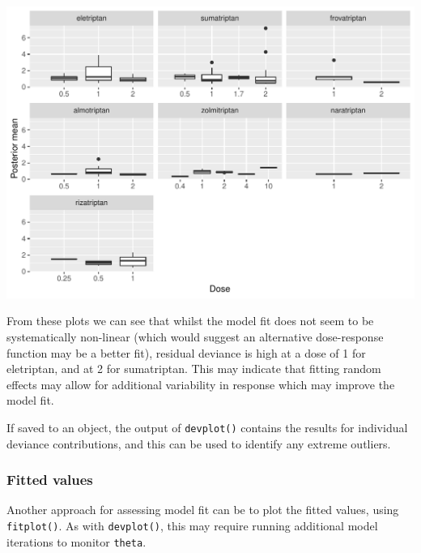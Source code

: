 \documentclass[]{article}
\newenvironment{Shaded}{\begin{snugshade}}{\end{snugshade}}
\newcommand{\CommentTok}[1]{\textcolor[rgb]{0.56,0.35,0.01}{\textit{#1}}}
\newcommand{\KeywordTok}[1]{\textcolor[rgb]{0.13,0.29,0.53}{\textbf{#1}}}
\newcommand{\NormalTok}[1]{#1}
\begin{document}
\includegraphics{mbnmadose_files/figure-latex/unnamed-chunk-34-1.pdf}

From these plots we can see that whilst the model fit does not seem to
be systematically non-linear (which would suggest an alternative
dose-response function may be a better fit), residual deviance is high
at a dose of 1 for eletriptan, and at 2 for sumatriptan. This may
indicate that fitting random effects may allow for additional
variability in response which may improve the model fit.

If saved to an object, the output of \texttt{devplot()} contains the
results for individual deviance contributions, and this can be used to
identify any extreme outliers.

\hypertarget{fitted-values}{%
\subsubsection{Fitted values}\label{fitted-values}}

Another approach for assessing model fit can be to plot the fitted
values, using \texttt{fitplot()}. As with \texttt{devplot()}, this may
require running additional model iterations to monitor \texttt{theta}.

\begin{Shaded}
\end{Shaded}
\end{document}

